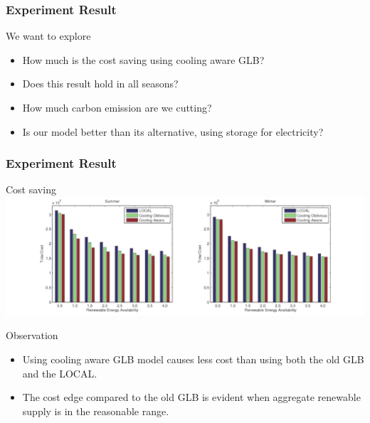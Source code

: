 \documentclass[xcolor=dvipsnames]{beamer}
\begin{document}
\begin{frame}
\frametitle{Experiment Result}
\begin{block}
{We want to explore}
\begin{itemize}
\item
How much is the cost saving using cooling aware GLB? 
\item
Does this result hold in all seasons?
\item
How much carbon emission are we cutting?
\item
Is our model better than its alternative, using storage for electricity?
\end{itemize}
\end{block}
\end{frame}
%
%
\begin{frame}
\frametitle{Experiment Result}
\begin{block}
{Cost saving}
\includegraphics[scale = 0.37]{cost_comparison.pdf}
\end{block}
\begin{block}
{Observation}
\begin{itemize}
\item
Using cooling aware GLB model causes less cost than using both the old GLB and the LOCAL.
\item
The cost edge compared to the old GLB is evident when aggregate renewable supply is in the reasonable range. 
\end{itemize}
\end{block}
\end{frame}
%
%
\end{document}
